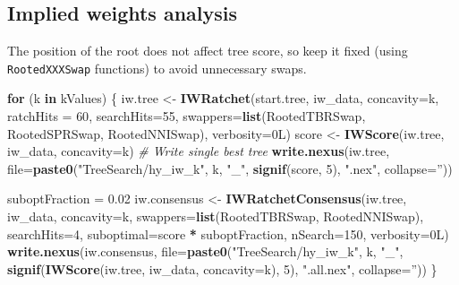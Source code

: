 \documentclass[]{book}
\newenvironment{Shaded}{\begin{snugshade}}{\end{snugshade}}
\newcommand{\KeywordTok}[1]{\textcolor[rgb]{0.13,0.29,0.53}{\textbf{#1}}}
\newcommand{\DataTypeTok}[1]{\textcolor[rgb]{0.13,0.29,0.53}{#1}}
\newcommand{\DecValTok}[1]{\textcolor[rgb]{0.00,0.00,0.81}{#1}}
\newcommand{\FloatTok}[1]{\textcolor[rgb]{0.00,0.00,0.81}{#1}}
\newcommand{\StringTok}[1]{\textcolor[rgb]{0.31,0.60,0.02}{#1}}
\newcommand{\CommentTok}[1]{\textcolor[rgb]{0.56,0.35,0.01}{\textit{#1}}}
\newcommand{\ControlFlowTok}[1]{\textcolor[rgb]{0.13,0.29,0.53}{\textbf{#1}}}
\newcommand{\OperatorTok}[1]{\textcolor[rgb]{0.81,0.36,0.00}{\textbf{#1}}}
\newcommand{\NormalTok}[1]{#1}
\theoremstyle{definition}
\theoremstyle{definition}
\theoremstyle{definition}
\theoremstyle{remark}
\begin{document}
\hypertarget{implied-weights-analysis}{%
\subsection{Implied weights analysis}\label{implied-weights-analysis}}

The position of the root does not affect tree score, so keep it fixed
(using \texttt{RootedXXXSwap} functions) to avoid unnecessary swaps.

\begin{Shaded}
\begin{Highlighting}[]
\ControlFlowTok{for}\NormalTok{ (k }\ControlFlowTok{in}\NormalTok{ kValues) \{}
\NormalTok{  iw.tree <-}\StringTok{ }\KeywordTok{IWRatchet}\NormalTok{(start.tree, iw_data, }\DataTypeTok{concavity=}\NormalTok{k,}
                       \DataTypeTok{ratchHits =} \DecValTok{60}\NormalTok{, }\DataTypeTok{searchHits=}\DecValTok{55}\NormalTok{,}
                       \DataTypeTok{swappers=}\KeywordTok{list}\NormalTok{(RootedTBRSwap, RootedSPRSwap, RootedNNISwap),}
                       \DataTypeTok{verbosity=}\NormalTok{0L)}
\NormalTok{  score <-}\StringTok{ }\KeywordTok{IWScore}\NormalTok{(iw.tree, iw_data, }\DataTypeTok{concavity=}\NormalTok{k)}
  \CommentTok{# Write single best tree}
  \KeywordTok{write.nexus}\NormalTok{(iw.tree,}
              \DataTypeTok{file=}\KeywordTok{paste0}\NormalTok{(}\StringTok{"TreeSearch/hy_iw_k"}\NormalTok{, k, }\StringTok{"_"}\NormalTok{, }
                          \KeywordTok{signif}\NormalTok{(score, }\DecValTok{5}\NormalTok{), }\StringTok{".nex"}\NormalTok{, }\DataTypeTok{collapse=}\StringTok{''}\NormalTok{))}

\NormalTok{  suboptFraction =}\StringTok{ }\FloatTok{0.02}
\NormalTok{  iw.consensus <-}\StringTok{ }\KeywordTok{IWRatchetConsensus}\NormalTok{(iw.tree, iw_data, }\DataTypeTok{concavity=}\NormalTok{k,}
                  \DataTypeTok{swappers=}\KeywordTok{list}\NormalTok{(RootedTBRSwap, RootedNNISwap),}
                  \DataTypeTok{searchHits=}\DecValTok{4}\NormalTok{,}
                  \DataTypeTok{suboptimal=}\NormalTok{score }\OperatorTok{*}\StringTok{ }\NormalTok{suboptFraction,}
                  \DataTypeTok{nSearch=}\DecValTok{150}\NormalTok{, }\DataTypeTok{verbosity=}\NormalTok{0L)}
  \KeywordTok{write.nexus}\NormalTok{(iw.consensus, }
              \DataTypeTok{file=}\KeywordTok{paste0}\NormalTok{(}\StringTok{"TreeSearch/hy_iw_k"}\NormalTok{, k, }\StringTok{"_"}\NormalTok{, }
                          \KeywordTok{signif}\NormalTok{(}\KeywordTok{IWScore}\NormalTok{(iw.tree, iw_data, }\DataTypeTok{concavity=}\NormalTok{k), }\DecValTok{5}\NormalTok{),}
                          \StringTok{".all.nex"}\NormalTok{, }\DataTypeTok{collapse=}\StringTok{''}\NormalTok{))}
\NormalTok{\}}
\end{Highlighting}
\end{Shaded}
\end{document}
